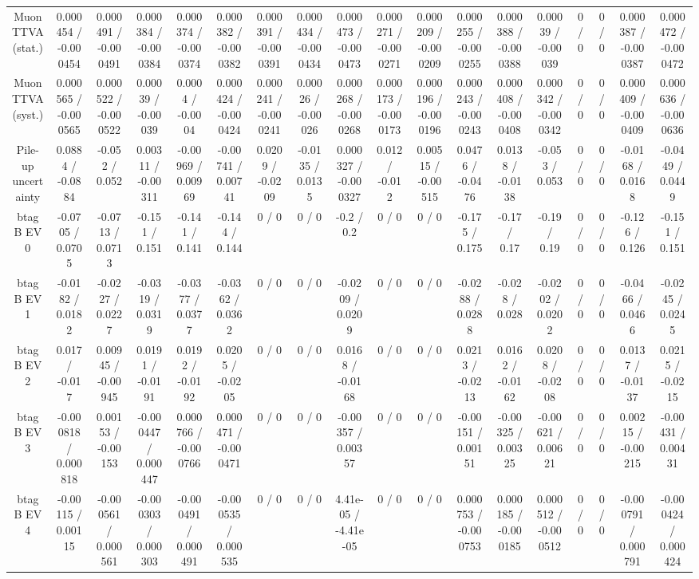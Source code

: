 \documentclass[10pt]{article}
\begin{document}
\begin{table}[htbp]
\begin{center}
\begin{tabular}{|c|c|c|c|c|c|c|c|c|c|c|c|c|c|c|c|c|c|}
  Muon TTVA (stat.) & 0.000454 / -0.000454 & 0.000491 / -0.000491 & 0.000384 / -0.000384 & 0.000374 / -0.000374 & 0.000382 / -0.000382 & 0.000391 / -0.000391 & 0.000434 / -0.000434 & 0.000473 / -0.000473 & 0.000271 / -0.000271 & 0.000209 / -0.000209 & 0.000255 / -0.000255 & 0.000388 / -0.000388 & 0.00039 / -0.00039 & 0 / 0 & 0 / 0 & 0.000387 / -0.000387 & 0.000472 / -0.000472 \\ 
  Muon TTVA (syst.) & 0.000565 / -0.000565 & 0.000522 / -0.000522 & 0.00039 / -0.00039 & 0.0004 / -0.0004 & 0.000424 / -0.000424 & 0.000241 / -0.000241 & 0.00026 / -0.00026 & 0.000268 / -0.000268 & 0.000173 / -0.000173 & 0.000196 / -0.000196 & 0.000243 / -0.000243 & 0.000408 / -0.000408 & 0.000342 / -0.000342 & 0 / 0 & 0 / 0 & 0.000409 / -0.000409 & 0.000636 / -0.000636 \\ 
  Pile-up uncertainty & 0.0884 / -0.0884 & -0.052 / 0.052 & 0.00311 / -0.00311 & -0.00969 / 0.00969 & -0.00741 / 0.00741 & 0.0209 / -0.0209 & -0.0135 / 0.0135 & 0.000327 / -0.000327 & 0.012 / -0.012 & 0.00515 / -0.00515 & 0.0476 / -0.0476 & 0.0138 / -0.0138 & -0.053 / 0.053 & 0 / 0 & 0 / 0 & -0.0168 / 0.0168 & -0.0449 / 0.0449 \\ 
  btag B EV 0 & -0.0705 / 0.0705 & -0.0713 / 0.0713 & -0.151 / 0.151 & -0.141 / 0.141 & -0.144 / 0.144 & 0 / 0 & 0 / 0 & -0.2 / 0.2 & 0 / 0 & 0 / 0 & -0.175 / 0.175 & -0.17 / 0.17 & -0.19 / 0.19 & 0 / 0 & 0 / 0 & -0.126 / 0.126 & -0.151 / 0.151 \\ 
  btag B EV 1 & -0.0182 / 0.0182 & -0.0227 / 0.0227 & -0.0319 / 0.0319 & -0.0377 / 0.0377 & -0.0362 / 0.0362 & 0 / 0 & 0 / 0 & -0.0209 / 0.0209 & 0 / 0 & 0 / 0 & -0.0288 / 0.0288 & -0.028 / 0.028 & -0.0202 / 0.0202 & 0 / 0 & 0 / 0 & -0.0466 / 0.0466 & -0.0245 / 0.0245 \\ 
  btag B EV 2 & 0.017 / -0.017 & 0.00945 / -0.00945 & 0.0191 / -0.0191 & 0.0192 / -0.0192 & 0.0205 / -0.0205 & 0 / 0 & 0 / 0 & 0.0168 / -0.0168 & 0 / 0 & 0 / 0 & 0.0213 / -0.0213 & 0.0162 / -0.0162 & 0.0208 / -0.0208 & 0 / 0 & 0 / 0 & 0.0137 / -0.0137 & 0.0215 / -0.0215 \\ 
  btag B EV 3 & -0.000818 / 0.000818 & 0.00153 / -0.00153 & -0.000447 / 0.000447 & 0.000766 / -0.000766 & 0.000471 / -0.000471 & 0 / 0 & 0 / 0 & -0.00357 / 0.00357 & 0 / 0 & 0 / 0 & -0.00151 / 0.00151 & -0.00325 / 0.00325 & -0.00621 / 0.00621 & 0 / 0 & 0 / 0 & 0.00215 / -0.00215 & -0.00431 / 0.00431 \\ 
  btag B EV 4 & -0.00115 / 0.00115 & -0.000561 / 0.000561 & -0.000303 / 0.000303 & -0.000491 / 0.000491 & -0.000535 / 0.000535 & 0 / 0 & 0 / 0 & 4.41e-05 / -4.41e-05 & 0 / 0 & 0 / 0 & 0.000753 / -0.000753 & 0.000185 / -0.000185 & 0.000512 / -0.000512 & 0 / 0 & 0 / 0 & -0.000791 / 0.000791 & -0.000424 / 0.000424 \\ 

\end{tabular}
\end{center}
\end{table}
\end{document}
